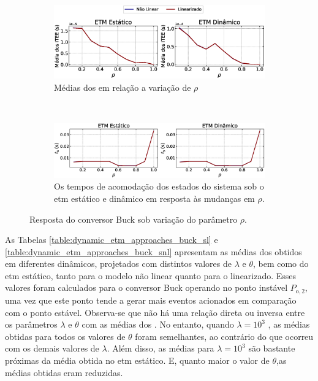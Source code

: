 \begin{figure}[H]
  \centering
  \captionsetup{justification=centering}
  \begin{subfigure}{1.\textwidth}
    \centering
    \includegraphics[width=1.\textwidth]{figuras/buck/itee-mean.eps}
    \caption{Médias dos  em relação a variação de $\rho$}
  \end{subfigure}
  \\[6pt]
  \begin{subfigure}{1.\textwidth} 
    \centering
    \includegraphics[width=1.\textwidth]{figuras/buck/ts.eps}
    \caption{Os tempos de acomodação dos estados do sistema sob o \acrshort{etm} estático e dinâmico em resposta às mudanças em $\rho$.}
  \end{subfigure}
  \caption{Resposta do conversor Buck sob variação do parâmetro $\rho$.}
  \label{fig:buck_converter_rho}
\end{figure}

As Tabelas \ref{table:dynamic_etm_approaches_buck_sl} e \ref{table:dynamic_etm_approaches_buck_snl} apresentam as médias dos  obtidos em diferentes  dinâmicos, projetados com distintos valores de $\lambda$ e $\theta$, bem como do \acrshort{etm} estático, tanto para o modelo não linear quanto para o linearizado. Esses valores foram calculados para o conversor Buck operando no ponto instável $P_{\mathrm{o}, 2}$, uma vez que este ponto tende a gerar mais eventos acionados em comparação com o ponto estável. Observa-se que não há uma relação direta ou inversa entre os parâmetros $\lambda$ e $\theta$ com as médias dos . No entanto, quando $\lambda = 10^3$ , as médias obtidas para todos os valores de $\theta$ foram semelhantes, ao contrário do que ocorreu com os demais valores de $\lambda$. Além disso, as médias para $\lambda = 10^3$ são bastante próximas da média obtida no \acrshort{etm} estático. E, quanto maior o valor de $\theta$,as médias obtidas eram reduzidas.

